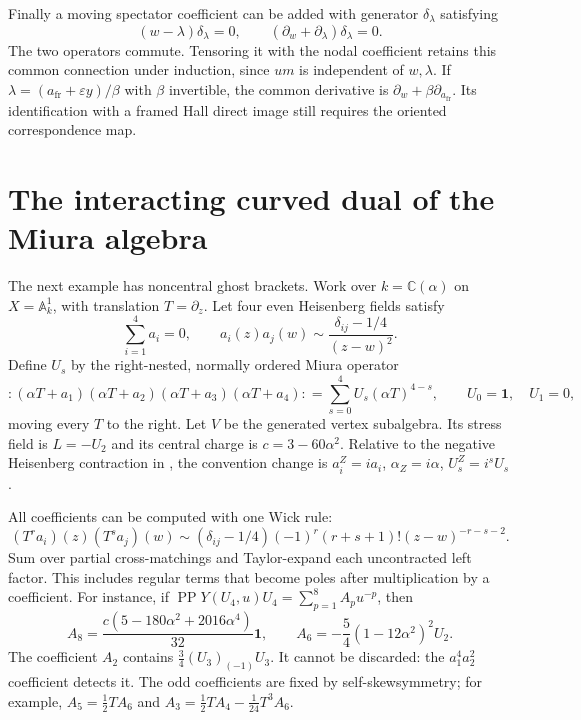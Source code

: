 Finally a moving spectator coefficient can be added with generator
$\delta_\lambda$ satisfying
\[
 (w-\lambda)\delta_\lambda=0,\qquad
 (\partial_w+\partial_\lambda)\delta_\lambda=0.
\]
The two operators commute.  Tensoring it with the nodal coefficient
retains this common connection under induction, since $um$ is
independent of $w,\lambda$.  If
$\lambda=(a_{\mathrm{fr}}+\varepsilon y)/\beta$ with $\beta$ invertible,
the common derivative is $\partial_w+\beta\partial_{a_{\mathrm{fr}}}$.
Its identification with a framed Hall direct image still requires the
oriented correspondence map.

\section{The interacting curved dual of the Miura algebra}
\label{cyquant:sec:wfour}

The next example has noncentral ghost brackets.  Work over
$k=\mathbb C(\alpha)$ on $X=\mathbb A^1_k$, with translation $T=\partial_z$.
Let four even Heisenberg fields satisfy
\[
 \sum_{i=1}^4a_i=0,\qquad
 a_i(z)a_j(w)\sim\frac{\delta_{ij}-1/4}{(z-w)^2}.
\]
Define $U_s$ by the right-nested, normally ordered Miura operator
\begin{equation}\label{cyquant:eq:miura}
 {:}(\alpha T+a_1)(\alpha T+a_2)(\alpha T+a_3)(\alpha T+a_4){:}
   =\sum_{s=0}^4U_s(\alpha T)^{4-s},
 \qquad U_0=\mathbf1,\quad U_1=0,
\end{equation}
moving every $T$ to the right.  Let $V$ be the generated vertex
subalgebra.  Its stress field is $L=-U_2$ and its central charge is
$c=3-60\alpha^2$.  Relative to the negative Heisenberg contraction in
\cite{cyquant:Zhu}, the convention change is
$a_i^Z=ia_i$, $\alpha_Z=i\alpha$, $U_s^Z=i^sU_s$.

All coefficients can be computed with one Wick rule:
\begin{equation}\label{cyquant:eq:miura-wick}
 (T^ra_i)(z)(T^sa_j)(w)\sim
  (\delta_{ij}-1/4)(-1)^r(r+s+1)!(z-w)^{-r-s-2}.
\end{equation}
Sum over partial cross-matchings and Taylor-expand each uncontracted
left factor.  This includes regular terms that become poles after
multiplication by a coefficient.  For instance, if
$\operatorname{PP}Y(U_4,u)U_4=\sum_{p=1}^8A_pu^{-p}$, then
\[
 A_8=\frac{c(5-180\alpha^2+2016\alpha^4)}{32}\mathbf1,
 \qquad A_6=-\frac54(1-12\alpha^2)^2U_2.
\]
The coefficient $A_2$ contains $\frac34(U_3)_{(-1)}U_3$.
It cannot be discarded: the $a_1^4a_2^2$ coefficient detects it.
The odd coefficients are fixed by self-skewsymmetry; for example,
$A_5=\frac12TA_6$ and
$A_3=\frac12TA_4-\frac1{24}T^3A_6$.

